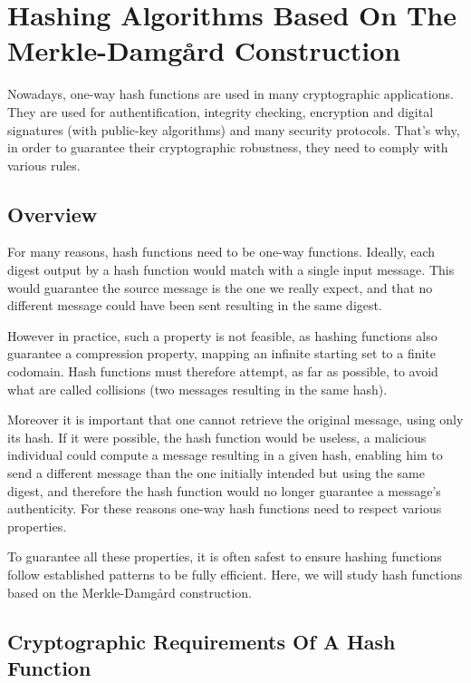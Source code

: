 \chapter{Hashing Algorithms Based On The Merkle-Damg\r{a}rd  Construction}\label{chap:Merkle}

Nowadays, one-way hash functions are used in many cryptographic applications.\\
They are used for authentification, integrity checking, encryption and digital signatures (with public-key algorithms) and many security protocols. That's why, in order to guarantee their cryptographic robustness, they need to comply with various rules.

\section{Overview}

For many reasons, hash functions need to be one-way functions.
Ideally, each digest output by a hash function would match with a single input message. This would guarantee the source message is the one we really expect, and that no different message could have been sent resulting in the same digest.

However in practice, such a property is not feasible, as hashing functions also guarantee a compression property, mapping an infinite starting set to a finite codomain.
Hash functions must therefore attempt, as far as possible, to avoid what are called collisions (two messages resulting in the same hash).

Moreover it is important that one cannot retrieve the original message, using only its hash.
If it were possible, the hash function would be useless, a malicious individual could compute a message resulting in a given hash, enabling him to send a different message than the one initially intended but using the same digest, and therefore the hash function would no longer guarantee a message's authenticity. For these reasons one-way hash functions need to respect various properties.

To guarantee all these properties, it is often safest to ensure hashing functions follow established patterns to be fully efficient. Here, we will study hash functions based on the Merkle-Damg\r{a}rd construction. 


\section{Cryptographic Requirements Of A Hash Function}~\label{sec:requirements}

